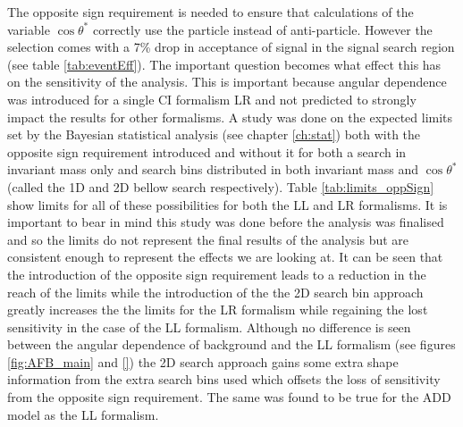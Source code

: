     The opposite sign requirement is needed to ensure that calculations of the variable $\cos{\theta^{*}}$  correctly use the particle instead of anti-particle. However the selection comes with a 7\% drop in acceptance of signal in the signal search region (see table \ref{tab:eventEff}). The important question becomes what effect this has on the sensitivity of the analysis. This is important because angular dependence was introduced for a single CI formalism LR and not predicted to strongly impact the results for other formalisms. 
    A study was done on the expected limits set by the Bayesian statistical analysis (see chapter \ref{ch:stat}) both with the opposite sign requirement introduced and without it for both a search in invariant mass only and search bins distributed in both invariant mass and $\cos{\theta^{*}}$ (called the 1D and 2D bellow search respectively). Table \ref{tab:limits_oppSign} show limits for all of these possibilities for both the LL and LR formalisms. It is important to bear in mind this study was done before the analysis was finalised and so the limits do not represent the final results of the analysis but are consistent enough to represent the effects we are looking at. It can be seen that the introduction of the opposite sign requirement leads to a reduction in the reach of the limits while the introduction of the the 2D search bin approach greatly increases the the limits for the LR formalism while regaining the lost sensitivity in the case of the LL formalism. Although no difference is seen between the angular dependence of background and the LL formalism (see figures \ref{fig:AFB_main} and \ref{}) the 2D search approach gains some extra shape information from the extra search bins used which offsets the loss of sensitivity from the opposite sign requirement. The same was found to be true for the ADD model as the LL formalism.  


